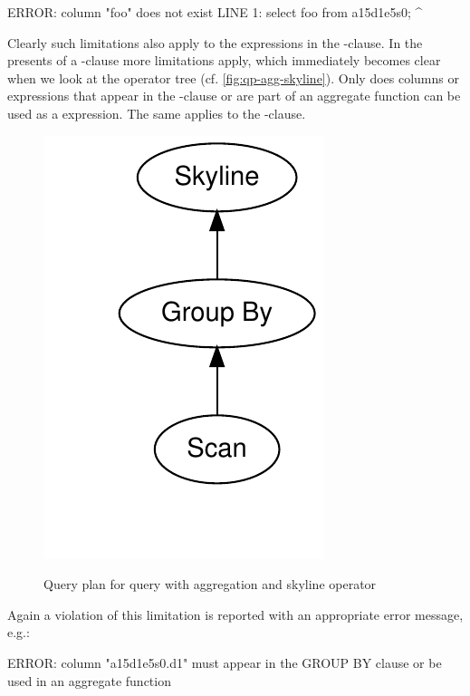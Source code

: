 \begin{interactive}
ERROR:  column "foo" does not exist
LINE 1: select foo from a15d1e5s0;
               ^
\end{interactive}

\noindent
Clearly such limitations also apply to the expressions in the
-clause.  In the presents of a
-clause more limitations apply, which immediately
becomes clear when we look at the operator tree
(cf. \autoref{fig:qp-agg-skyline}).  Only does columns or expressions
that appear in the -clause or are part of an
aggregate function can be used as a  expression.
The same applies to the -clause.

\begin{figure}[htbp]
\centering
\includegraphics[scale=0.5]{plots-qp/qp-agg-skyline}\\
\caption{Query plan for query with aggregation and skyline operator}
\label{fig:qp-agg-skyline}
\end{figure}

\noindent
Again a violation of this limitation is reported with an appropriate
error message, e.g.:

\begin{interactive}
ERROR:  column "a15d1e5s0.d1" must appear in the GROUP BY clause or be used 
in an aggregate function
\end{interactive}

